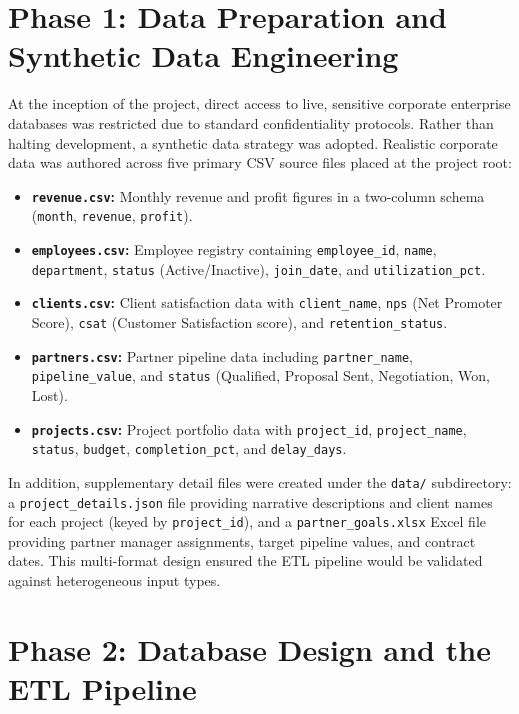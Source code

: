 \documentclass{book}
\begin{document}
\section{Phase 1: Data Preparation and Synthetic Data Engineering}
At the inception of the project, direct access to live, sensitive corporate enterprise databases was restricted due to standard confidentiality protocols. Rather than halting development, a synthetic data strategy was adopted. Realistic corporate data was authored across five primary CSV source files placed at the project root:

\begin{itemize}
    \item \textbf{\texttt{revenue.csv}:} Monthly revenue and profit figures in a two-column schema (\texttt{month}, \texttt{revenue}, \texttt{profit}).
    \item \textbf{\texttt{employees.csv}:} Employee registry containing \texttt{employee\_id}, \texttt{name}, \texttt{department}, \texttt{status} (Active/Inactive), \texttt{join\_date}, and \texttt{utilization\_pct}.
    \item \textbf{\texttt{clients.csv}:} Client satisfaction data with \texttt{client\_name}, \texttt{nps} (Net Promoter Score), \texttt{csat} (Customer Satisfaction score), and \texttt{retention\_status}.
    \item \textbf{\texttt{partners.csv}:} Partner pipeline data including \texttt{partner\_name}, \texttt{pipeline\_value}, and \texttt{status} (Qualified, Proposal Sent, Negotiation, Won, Lost).
    \item \textbf{\texttt{projects.csv}:} Project portfolio data with \texttt{project\_id}, \texttt{project\_name}, \texttt{status}, \texttt{budget}, \texttt{completion\_pct}, and \texttt{delay\_days}.
\end{itemize}

\par\noindent
In addition, supplementary detail files were created under the \texttt{data/} subdirectory: a \texttt{project\_details.json} file providing narrative descriptions and client names for each project (keyed by \texttt{project\_id}), and a \texttt{partner\_goals.xlsx} Excel file providing partner manager assignments, target pipeline values, and contract dates. This multi-format design ensured the ETL pipeline would be validated against heterogeneous input types.

\section{Phase 2: Database Design and the ETL Pipeline}
\end{document}
